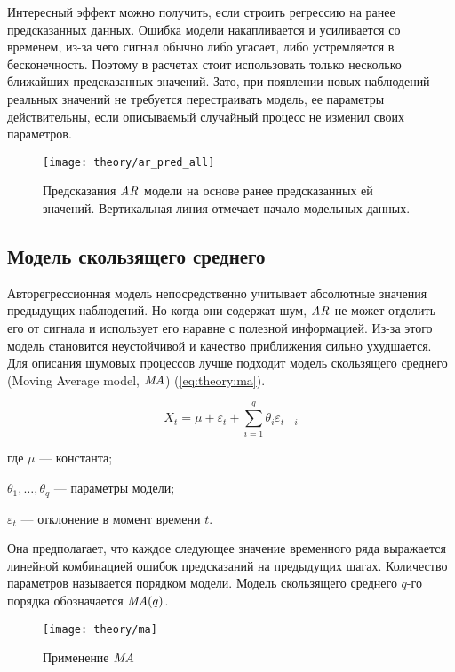 Интересный эффект можно получить, если строить регрессию на ранее предсказанных данных. Ошибка модели накапливается и усиливается со временем, из-за чего сигнал обычно либо угасает, либо устремляется в бесконечность. Поэтому в расчетах стоит использовать только несколько ближайших предсказанных значений. Зато, при появлении новых наблюдений реальных значений не требуется перестраивать модель, ее параметры действительны, если описываемый случайный процесс не изменил своих параметров.

\begin{figure}[h]
  \centering
  \texttt{[image: theory/ar\_pred\_all]}
  \caption{Предсказания $\mathit{AR}$ модели на основе ранее предсказанных ей значений. Вертикальная линия отмечает начало модельных данных.}
  \label{fig:theory:ar_pred_all}
\end{figure}


\subsection{Модель скользящего среднего}

Авторегрессионная модель непосредственно учитывает абсолютные значения предыдущих наблюдений. Но когда они содержат шум, $\mathit{AR}$ не может отделить его от сигнала и использует его наравне с полезной информацией. Из-за этого модель становится неустойчивой и качество приближения сильно ухудшается. Для описания шумовых процессов лучше подходит модель скользящего среднего (Moving Average model, $\mathit{MA}$) (\autoref{eq:theory:ma}). \cite{weber_time_series}

\begin{equation}
  \label{eq:theory:ma}
  X_t = \mu + \varepsilon_t + \sum_{i=1}^q \theta_i \varepsilon_{t-i}
\end{equation}
\begin{explanation}
\item[где] $\mu$ --- константа;
\item $\theta_1, \dotsc, \theta_q$ --- параметры модели;
\item $\varepsilon_t$ --- отклонение в момент времени $t$.
\end{explanation}

Она предполагает, что каждое следующее значение временного ряда выражается линейной комбинацией ошибок предсказаний на предыдущих шагах. Количество параметров называется порядком модели. Модель скользящего среднего $q$-го порядка обозначается $\mathit{MA}(q)$.

\begin{figure}[h]
  \centering
  \texttt{[image: theory/ma]}
  \caption{Применение $\mathit{MA}$}
  \label{fig:theory:ma}
\end{figure}

